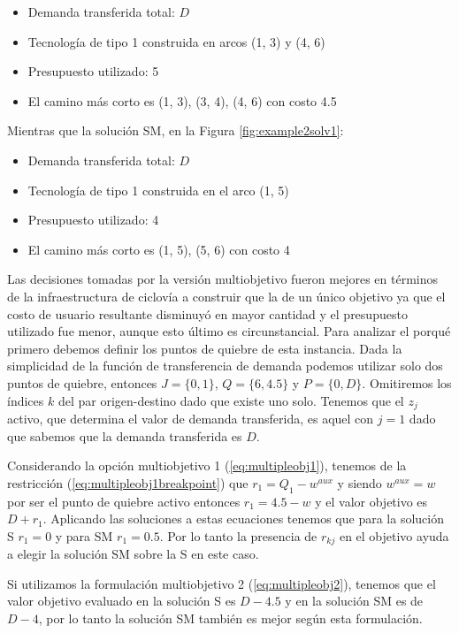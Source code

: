 \begin{itemize}
  \item{Demanda transferida total: $D$}
  \item{Tecnología de tipo 1 construida en arcos (1, 3) y (4, 6)}
  \item{Presupuesto utilizado: 5}
  \item{El camino más corto es (1, 3), (3, 4), (4, 6) con costo 4.5}
\end{itemize}

Mientras que la solución SM, en la Figura \ref{fig:example2solv1}:

\begin{itemize}
  \item{Demanda transferida total: $D$}
  \item{Tecnología de tipo 1 construida en el arco (1, 5)}
  \item{Presupuesto utilizado: 4}
  \item{El camino más corto es (1, 5), (5, 6) con costo 4}
\end{itemize}

Las decisiones tomadas por la versión multiobjetivo fueron mejores en términos de la infraestructura de ciclovía a construir que la de un único objetivo ya que el costo de usuario resultante disminuyó en mayor cantidad y el presupuesto utilizado fue menor, aunque esto último es circunstancial. Para analizar el porqué primero debemos definir los puntos de quiebre de esta instancia. Dada la simplicidad de la función de transferencia de demanda podemos utilizar solo dos puntos de quiebre, entonces $J = \{0, 1\}$, $Q = \{6, 4.5\}$ y $P = \{0, D\}$. Omitiremos los índices $k$ del par origen-destino dado que existe uno solo. Tenemos que el $z_j$ activo, que determina el valor de demanda transferida, es aquel con $j = 1$ dado que sabemos que la demanda transferida es $D$.

Considerando la opción multiobjetivo 1 (\ref{eq:multipleobj1}), tenemos de la restricción (\ref{eq:multipleobj1breakpoint}) que $r_1 = Q_1 - w^{aux}$ y siendo $w^{aux} = w$ por ser el punto de quiebre activo entonces $r_1 = 4.5 - w$ y el valor objetivo es $D + r_1$. Aplicando las soluciones a estas ecuaciones tenemos que para la solución S $r_1 = 0$ y para SM $r_1 = 0.5$. Por lo tanto la presencia de $r_{kj}$ en el objetivo ayuda a elegir la solución SM sobre la S en este caso.

Si utilizamos la formulación multiobjetivo 2 (\ref{eq:multipleobj2}), tenemos que el valor objetivo evaluado en la solución S es $D - 4.5$ y en la solución SM es de $D - 4$, por lo tanto la solución SM también es mejor según esta formulación.


